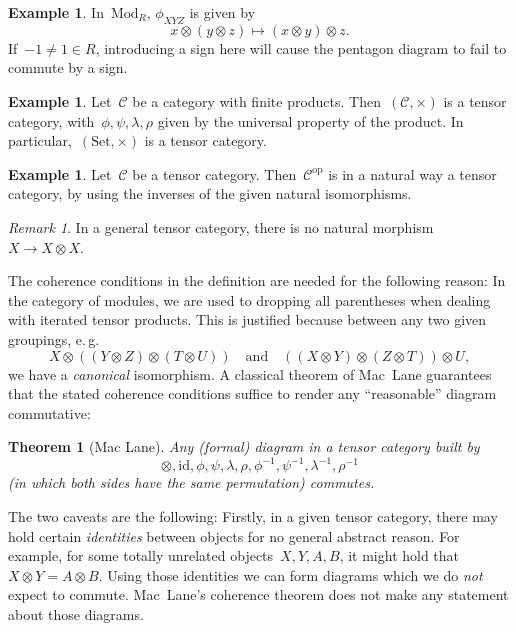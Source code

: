 \documentclass[a4paper,english,12pt]{scrartcl}
\theoremstyle{definition}
\newtheorem{ex}[defn]{Example}
\theoremstyle{plain}
\newtheorem{thm}[defn]{Theorem}
\theoremstyle{remark}
\newtheorem{rem}[defn]{Remark}
\newcommand{\C}{\mathcal{C}}
\newcommand{\id}{\mathrm{id}}
\newcommand{\op}{\mathrm{op}}
\renewcommand{\_}{\mathpunct{.}\,}
\newcommand{\?}{\,{:}\,}
\newcommand{\Mod}{\mathrm{Mod}}
\newcommand{\Set}{\mathrm{Set}}
\begin{document}
\begin{ex}In~$\Mod_R$, $\phi_{XYZ}$ is given by
\[ x \otimes (y \otimes z) \longmapsto (x \otimes y) \otimes z. \]
If~$-1 \neq 1 \in R$, introducing a sign here will cause the pentagon diagram
to fail to commute by a sign.\end{ex}

\begin{ex}Let~$\C$ be a category with finite products. Then~$(\C,\times)$ is a
tensor category, with~$\phi, \psi, \lambda, \rho$ given by the universal
property of the product. In particular,~$(\Set,\times)$ is a tensor
category.\end{ex}

\begin{ex}Let~$\C$ be a tensor category. Then~$\C^\op$ is in a natural way a
tensor category, by using the inverses of the given natural
isomorphisms.\end{ex}

\begin{rem}In a general tensor category, there is no natural morphism~$X \to X
\otimes X$.\end{rem}

The coherence conditions in the definition are needed for the following reason:
In the category of modules, we are used to dropping all parentheses when
dealing with iterated tensor products. This is justified because between any
two given groupings, e.\,g.
\[ X \otimes ((Y \otimes Z) \otimes (T \otimes U)) \quad\text{and}\quad
  ((X \otimes Y) \otimes (Z \otimes T)) \otimes U, \]
we have a \emph{canonical} isomorphism. A classical theorem of Mac~Lane
guarantees that the stated coherence conditions suffice to render any
``reasonable'' diagram commutative:

\begin{thm}[Mac Lane]Any (formal) diagram in a tensor category built
by \[
\otimes,\id,\phi,\psi,\lambda,\rho,\phi^{-1},\psi^{-1},\lambda^{-1},\rho^{-1}
\]
(in which both sides have the same permutation) commutes.\end{thm}

The two caveats are the following: Firstly, in a given tensor category, there
may hold certain \emph{identities} between objects for no general abstract
reason. For example, for some totally unrelated objects~$X,Y,A,B$, it might
hold that $X \otimes Y = A \otimes B$. Using those identities we can form
diagrams which we do \emph{not} expect to commute. Mac~Lane's coherence theorem
does not make any statement about those diagrams.
\end{document}
